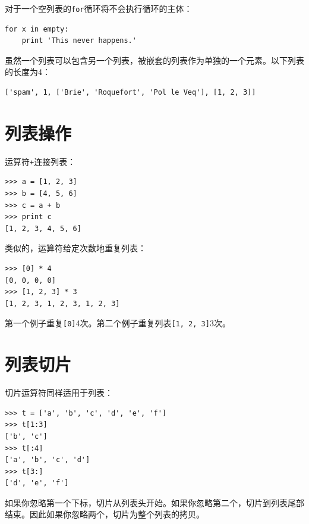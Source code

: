 
对于一个空列表的{\tt for}循环将不会执行循环的主体：

\beforeverb
\begin{verbatim}
for x in empty:
    print 'This never happens.'
\end{verbatim}
\afterverb
%
虽然一个列表可以包含另一个列表，被嵌套的列表作为单独的一个元素。以下列表的长度为4：


\beforeverb
\begin{verbatim}
['spam', 1, ['Brie', 'Roquefort', 'Pol le Veq'], [1, 2, 3]]
\end{verbatim}
\afterverb



\section{列表操作}

运算符{\tt +}连接列表：


\beforeverb
\begin{verbatim}
>>> a = [1, 2, 3]
>>> b = [4, 5, 6]
>>> c = a + b
>>> print c
[1, 2, 3, 4, 5, 6]
\end{verbatim}
\afterverb
%
类似的，运算符{\tt *}给定次数地重复列表：


\beforeverb
\begin{verbatim}
>>> [0] * 4
[0, 0, 0, 0]
>>> [1, 2, 3] * 3
[1, 2, 3, 1, 2, 3, 1, 2, 3]
\end{verbatim}
\afterverb
%
第一个例子重复{\tt [0]}4次。第二个例子重复列表{\tt [1, 2, 3]}3次。


\section{列表切片}


切片运算符同样适用于列表：

\beforeverb
\begin{verbatim}
>>> t = ['a', 'b', 'c', 'd', 'e', 'f']
>>> t[1:3]
['b', 'c']
>>> t[:4]
['a', 'b', 'c', 'd']
>>> t[3:]
['d', 'e', 'f']
\end{verbatim}
\afterverb
%
如果你忽略第一个下标，切片从列表头开始。如果你忽略第二个，切片到列表尾部结束。因此如果你忽略两个，切片为整个列表的拷贝。

